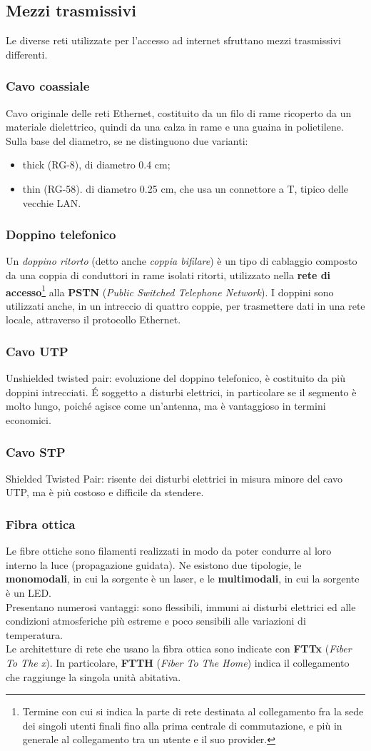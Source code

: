 \documentclass[a4paper,11pt]{article}
\def\subsub#1{\subsubsection{#1}\label{#1}}
\begin{document}
\subsection{Mezzi trasmissivi}
Le diverse reti utilizzate per l'accesso ad internet sfruttano mezzi trasmissivi differenti.
\subsubsection{Cavo coassiale}
Cavo originale delle reti Ethernet, costituito da un filo di rame ricoperto da un materiale dielettrico, quindi da una calza in rame e una guaina in polietilene. Sulla base del diametro, se ne distinguono due varianti:
\begin{itemize}
\item thick (RG-8), di diametro 0.4 cm;
\item thin (RG-58). di diametro 0.25 cm, che usa un connettore a T, tipico delle vecchie LAN.
\end{itemize}
\subsubsection{Doppino telefonico}
Un \textit{doppino ritorto} (detto anche \textit{coppia bifilare}) è un tipo di cablaggio composto da una coppia di conduttori in rame isolati ritorti, utilizzato nella \textbf{rete di accesso}\footnote{Termine con cui si indica la parte di rete destinata al collegamento fra la sede dei singoli utenti finali fino alla prima centrale di commutazione, e più in generale al collegamento tra un utente e il suo provider.} alla \textbf{PSTN} (\textit{Public Switched Telephone Network}).
I doppini sono utilizzati anche, in un intreccio di quattro coppie, per trasmettere dati in una rete locale, attraverso il protocollo Ethernet.
\subsub{Cavo UTP}
Unshielded twisted pair: evoluzione del doppino telefonico, è costituito da più doppini intrecciati. \'E soggetto a disturbi elettrici, in particolare se il segmento è molto lungo, poiché agisce come un'antenna, ma è vantaggioso in termini economici.
\subsub{Cavo STP}
Shielded Twisted Pair: risente dei disturbi elettrici in misura minore del cavo UTP, ma è più costoso e difficile da stendere.
\subsub{Fibra ottica}
Le fibre ottiche sono filamenti realizzati in modo da poter condurre al loro interno la luce (propagazione guidata). Ne esistono due tipologie, le \textbf{monomodali}, in cui la sorgente è un laser, e le \textbf{multimodali}, in cui la sorgente è un LED. \\Presentano numerosi vantaggi: sono flessibili, immuni ai disturbi elettrici ed alle condizioni atmosferiche più estreme e poco sensibili alle variazioni di temperatura.\\
Le architetture di rete che usano la fibra ottica sono indicate con \textbf{FTTx} (\textit{Fiber To The x}). In particolare, \textbf{FTTH} (\textit{Fiber To The Home}) indica il collegamento che raggiunge la singola unità abitativa.
\newpage
\end{document}
